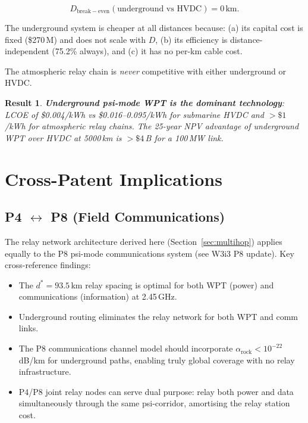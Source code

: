 \documentclass[aps,prd,twocolumn,superscriptaddress]{revtex4-2}
\newcommand{\alpharock}{\alpha_\mathrm{rock}}
\newtheorem{result}{Result}
\begin{document}
\begin{equation}
D_\mathrm{break-even}(\text{underground vs HVDC}) = 0\,\mathrm{km}.
\label{eq:breakeven}
\end{equation}

The underground system is cheaper at all distances because:
(a) its capital cost is fixed (\$270\,M) and does not scale with $D$,
(b) its efficiency is distance-independent (75.2\% always), and
(c) it has no per-km cable cost.

The atmospheric relay chain is \emph{never} competitive with either
underground or HVDC.

\begin{result}
\textbf{Underground psi-mode WPT is the dominant technology}:
LCOE of \$0.004/kWh vs \$0.016--0.095/kWh for submarine HVDC
and $>\$1$/kWh for atmospheric relay chains.
The 25-year NPV advantage of underground WPT over HVDC at 5000\,km
is $>\$4$\,B for a 100\,MW link.
\end{result}

\section{Cross-Patent Implications}
\label{sec:crosspatent}

\subsection{P4 $\leftrightarrow$ P8 (Field Communications)}

The relay network architecture derived here (Section~\ref{sec:multihop})
applies equally to the P8 psi-mode communications system
(see W3i3 P8 update).  Key cross-reference findings:
\begin{itemize}
\item The $d^* = 93.5$\,km relay spacing is optimal for both WPT
  (power) and communications (information) at 2.45\,GHz.
\item Underground routing eliminates the relay network for
  both WPT and comm links.
\item The P8 communications channel model should incorporate
  $\alpharock < 10^{-22}$\,dB/km for underground paths,
  enabling truly global coverage with no relay infrastructure.
\item P4/P8 joint relay nodes can serve dual purpose:
  relay both power and data simultaneously through the same
  psi-corridor, amortising the relay station cost.
\end{itemize}
\end{document}
